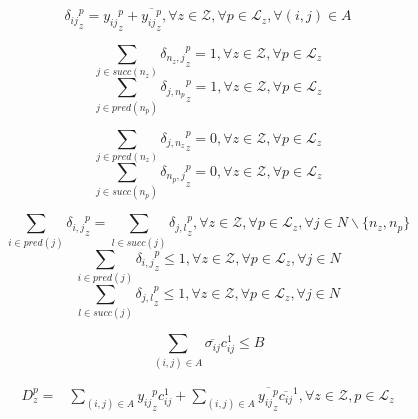 \begin{equation}\label{eq:path1}
{\delta_{ij}}_z^p = {y_{ij}}_z^p + \overline{{y_{ij}}_z^p},  \forall z \in \mathcal{Z}, \forall p \in \mathcal{L}_z, \forall (i,j) \in A 
\end{equation}

\begin{equation}\label{eq:path2}
\sum_{j \in succ(n_z)} {\delta_{n_z,j}}_z^p =1,  \forall z \in \mathcal{Z}, \forall p \in \mathcal{L}_z 
\end{equation}
\begin{equation}
\sum_{j \in pred(n_p)} {\delta_{j, n_p}}_z^p =1,  \forall z \in \mathcal{Z}, \forall p \in \mathcal{L}_z 
\end{equation}

\begin{equation}\label{eq:path2bis}
\sum_{j \in pred(n_z)} {\delta_{j,n_z}}_z^p =0,  \forall z \in \mathcal{Z}, \forall p \in \mathcal{L}_z 
\end{equation}
\begin{equation}
\sum_{j \in succ(n_p)} {\delta_{n_p,j}}_z^p =0,  \forall z \in \mathcal{Z}, \forall p \in \mathcal{L}_z 
\end{equation}


\begin{equation}\label{eq:path4}
\sum_{i \in pred(j)} {\delta_{i,j}}_z^p = \sum_{l \in succ(j)} {\delta_{j,l}}_z^p  ,   \forall z \in \mathcal{Z}, \forall p \in \mathcal{L}_z , \forall j \in N\backslash \{n_z, n_p\}
\end{equation}
\begin{equation}\label{eq:path5}
\sum_{i \in pred(j)} {\delta_{i,j}}_z^p \leq 1,  \forall z \in \mathcal{Z}, \forall p \in \mathcal{L}_z, \forall j \in N
\end{equation}
\begin{equation}
\sum_{l \in succ(j)} {\delta_{j,l}}_z^p \leq 1,  \forall z \in \mathcal{Z}, \forall p \in \mathcal{L}_z, \forall j \in N
\end{equation}

\begin{equation}\label{eq:limit1}
\sum_{(i,j)\in A} \overline{\sigma_{ij}} c_{ij}^1  \leq B
\end{equation}

\begin{equation}\label{eq:pathcost}
\begin{aligned}
D_z^p = & \sum_{(i,j) \in A} {y_{ij}}_z^p c^1_{ij} 
 + \sum_{(i,j) \in A}  \overline{{y_{ij}}_z^p}  \overline{c_{ij}}^1 , \forall z \in \mathcal{Z}, p \in \mathcal{L}_z \\
\end{aligned}
\end{equation}

